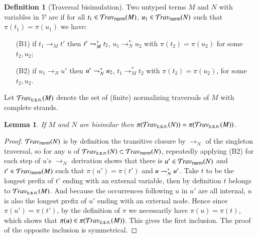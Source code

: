 \documentclass{elsarticle}
\theoremstyle{plain}
\newtheorem{lemma}[theorem]{Lemma}
\theoremstyle{definition}
\newtheorem{definition}{Definition}[section]
\newcommand{\normalizing}{{\sf norm}}
\newcommand{\travsetnorm}{\travset_\normalizing} %
\newcommand{\travsetscn}{\travset_{\sf c.s.n.}} %
\def\coresymbol{\pi} %
\newcommand{\core}[1]{\coresymbol(#1)} %
\begin{document}
\begin{definition}[Traversal bisimulation]
\label{def:bisimilar_terms}
Two untyped terms $M$ and $N$ with variables in $\mathcal{V}$
 are  if
for all $t_1 \in \travsetnorm(M)$, $u_1 \in \travsetnorm(N)$ such that
$\core{t_1} = \core{u_1}$ we have:
\begin{itemize}[nosep]
    \item[(B1)]
    if $t_1 \rightarrow_M t'$ then
        $t' \rightharpoondown_M^* t_2$,
        $u_1 \rightarrow^*_N u_2$
        with $\core{t_2} = \core{u_2}$
        for some $t_2, u_2$;
    \item[(B2)]
    if $u_1 \rightarrow_N u'$ then
      $u' \rightharpoondown_N^* u_2$,
      $t_1 \rightarrow^*_M t_2$
      with $\core{t_2} = \core{u_2}$,
       for some $t_2,u_2$.
\end{itemize}
\end{definition}


Let $\travsetscn(M)$ denote the set of (finite) normalizing traversals of $M$ with complete strands.

\begin{lemma}
\label{lem:bisimulation_isomorphism}
If $M$ and $N$ are bisimilar
then $\coresymbol(\travsetscn(N)) = \coresymbol(\travsetscn(M))$.
\end{lemma}
\begin{proof}
$\travsetnorm(N)$ is by definition the transitive closure by $\rightarrow_N$ of the singleton traversal,
so for any $u$ of $\travsetscn(N) \subset \travsetnorm(N)$, repeatedly applying (B2) for each step of $u$'s $\rightarrow_N$ derivation shows that there is $u' \in \travsetnorm(N)$ and  $t' \in \travsetnorm(M)$
such that $\core{u'} = \core{t'}$
and $u \rightharpoondown_N^* u'$.
Take $t$ to be the longest prefix of $t'$ ending with an external variable, then by definition $t$ belongs to $\travsetscn(M)$.
And because the occurrences following $u$ in $u'$ are all internal, $u$ is also the longest prefix of $u'$ ending with an external node.
Hence since $\core{u'} = \core{t'}$, by the definition of
$\coresymbol$ we necessarily have $\core{u} = \core{t}$, which shows that
$\core{u}\in \core{\travsetscn(M)}$.
This gives the first inclusion.
The proof of the opposite inclusion is symmetrical.
\end{proof}
\end{document}
